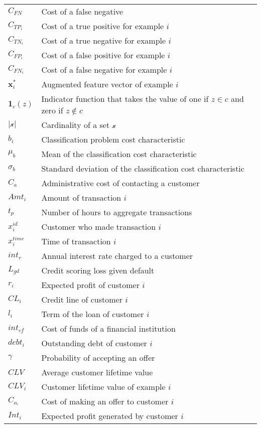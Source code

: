 \begin{tabularx}{\textwidth}{ l X }
$C_{FN}$    & Cost of a false negative    \\ 
$C_{TP_i}$		& Cost of a true positive for example $i$	 \\
$C_{TN_i}$		& Cost of a true negative for example $i$	 \\	
$C_{FP_i}$		& Cost of a false positive for example $i$	 \\	
$C_{FN_i}$		& Cost of a false negative for example $i$	 \\	
$\mathbf{x}_i^*$ 	& Augmented feature vector of example $i$ \\	
$\mathbf{1}_c(z)$ & Indicator function that takes the value of one if $z \in c$ and 
zero if $z \notin c$ \\
$\vert \mathcal{x} \vert$ & Cardinality of a set $\mathcal{x}$ \\
$b_i$ & Classification problem cost characteristic \\
$\mu_b$ & Mean of the classification cost characteristic \\
$\sigma_b$ & Standard deviation of the classification cost characteristic \\
$C_a$ & Administrative cost of contacting a customer \\
$Amt_i$ & Amount of transaction $i$ \\
$t_p$ & Number of hours to aggregate transactions\\
$x_i^{id}$ & Customer who made transaction $i$ \\
$x_i^{time}$ & Time of transaction $i$ \\
$int_r$ & Annual interest rate charged to a customer \\
$L_{gd}$ & Credit scoring loss given default \\
$r_i$ & Expected profit of customer $i$ \\
$CL_i$ & Credit line of customer $i$ \\
$l_i$ & Term of the loan of customer $i$\\
$int_{cf}$ & Cost of funds of a financial institution \\
$debt_i$ & Outstanding debt of customer $i$\\
$\gamma$  & Probability of accepting an offer \\
$CLV$ & Average customer lifetime value \\
$CLV_i$ & Customer lifetime value of example $i$ \\
$C_{o_i}$ & Cost of making an offer to customer $i$ \\
$Int_i$ & Expected profit generated by customer $i$ \\

\end{tabularx}
